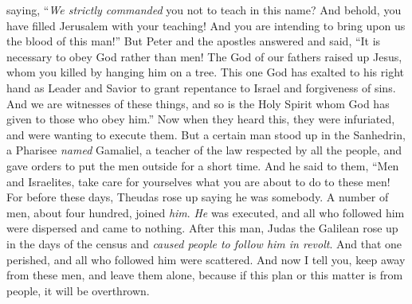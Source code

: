 \begin{biblechapter}
\verse saying, “\textit{We strictly commanded} you not to teach in this name? And behold, you have filled Jerusalem with your teaching! And you are intending to bring upon us the blood of this man!”
\verse But Peter and the apostles answered and said, “It is necessary to obey God rather than men!
\verse The God of our fathers raised up Jesus, whom you killed by hanging him on a tree.
\verse This one God has exalted to his right hand as Leader and Savior to grant repentance to Israel and forgiveness of sins.
\verse And we are witnesses of these things, and so is the Holy Spirit whom God has given to those who obey him.”
\verse Now when they heard this, they were infuriated, and were wanting to execute them.
\verse But a certain man stood up in the Sanhedrin, a Pharisee \textit{named} Gamaliel, a teacher of the law respected by all the people, and gave orders to put the men outside for a short time.
\verse And he said to them, “Men and Israelites, take care for yourselves what you are about to do to these men!
\verse For before these days, Theudas rose up saying he was somebody. A number of men, about four hundred, joined \textit{him}. \textit{He} was executed, and all who followed him were dispersed and came to nothing.
\verse After this man, Judas the Galilean rose up in the days of the census and \textit{caused people to follow him in revolt}. And that one perished, and all who followed him were scattered.
\verse And now I tell you, keep away from these men, and leave them alone, because if this plan or this matter is from people, it will be overthrown.

\end{biblechapter}

